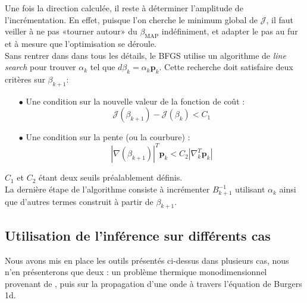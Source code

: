 \documentclass[a4paper,12pt]{article}
\newcommand{\bepar}[1]{
	\left( #1 \right)  
}
\newcommand{\bmap}{\beta_{\text{MAP}}}
\newcommand{\J}{\mathcal{J}}
\newcommand\bk{\color{black}}
\newcommand\brick{\color{brick}}
\numberwithin{equation}{section} %
\begin{document}
\noindent Une fois la direction calculée, il reste à déterminer l'amplitude de l'incrémentation. En effet, puisque l'on cherche le minimum global de $\J$, il faut veiller à ne pas «tourner autour» du $\bmap$ indéfiniment, et adapter le pas au fur et à mesure que l'optimisation se déroule.\\ 
Sans rentrer dans dans tous les détails, le BFGS utilise un algorithme de \textit{line search} pour trouver $ \displaystyle \alpha_k$ tel que $d\beta_k = \alpha_k\mathbf{p}_k$. Cette recherche doit satisfaire deux critères sur $\beta_{k+1}$: 
\begin{itemize}
\item[$\bullet$] Une condition sur la nouvelle valeur de la fonction de coût : \begin{equation}
\J\bepar{\beta_{k+1}} - \J\bepar{\beta_k} < C_1
\end{equation} 

\item[$\bullet$] Une condition sur la pente (ou la courbure) : 
\begin{equation}
|\nabla(\beta_{k+1})|^T\textbf{p}_k < C_2 |\nabla_k^T\textbf{p}_k|
\end{equation}
\end{itemize} 
$C_1$ et $C_2$ étant deux seuils préalablement définis.\\
La dernière étape de l'algorithme consiste à incrémenter $B_{k+1}^{-1}$ utilisant $\alpha_k$ ainsi que d'autres termes construit à partir de $\beta_{k+1}$.\\

\pagebreak

\brick \subsection{Utilisation de l'inférence sur différents cas} \bk

Nous avons mis en place les outils présentés ci-dessus dans plusieurs cas, nous n'en présenterons que deux : un problème thermique monodimensionnel provenant de \citep{parish2016paradigm}, puis sur la propagation d'une onde à travers l'équation de Burgers 1d.
\end{document}
